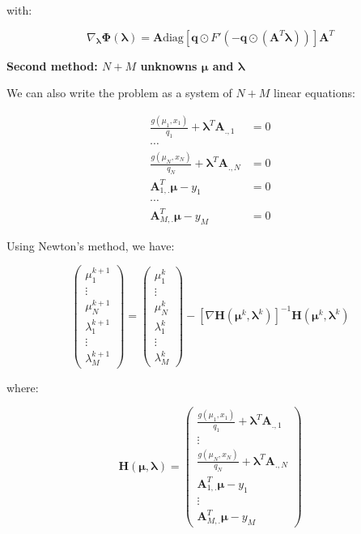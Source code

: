 \documentclass{tex/note}
\begin{document}
with:

\begin{equation*}
\nabla_{\bm{\lambda}} \bm{\Phi} \left( \bm{\lambda} \right) = \bm{A} \text{diag} \left[ \bm{q} \odot F' \left( - \bm{q} \odot \left( \bm{A}^T \bm{\lambda} \right) \right) \right] \bm{A}^T
\end{equation*}

\textbf{Second method: $N + M$ unknowns $\bm{\mu}$ and $\bm{\lambda}$}

We can also write the problem as a system of $N + M$ linear equations:

\begin{align*}
\frac{g \left( \mu_1 , x_1 \right)}{q_1} + \bm{\lambda}^T \bm{A}_{.,1} &= 0 \\
\cdots & \\
\frac{g \left( \mu_N , x_N \right)}{q_N} + \bm{\lambda}^T \bm{A}_{.,N} &= 0 \\
\bm{A}_{1,.}^T \bm{\mu} - y_1 &= 0 \\
\cdots & \\
\bm{A}_{M,.}^T \bm{\mu} - y_M &= 0
\end{align*}

Using Newton's method, we have:

\begin{equation*}
\begin{pmatrix} \mu_1^{k + 1} \\ \vdots \\ \mu_N^{k + 1} \\ \lambda_1^{k + 1} \\ \vdots \\ \lambda_M^{k + 1} \end{pmatrix} = \begin{pmatrix} \mu_1^k \\ \vdots \\ \mu_N^k \\ \lambda_1^k \\ \vdots \\ \lambda_M^k \end{pmatrix} - \left[ \nabla \bm{H} \left( \bm{\mu}^k , \bm{\lambda}^k \right) \right] ^{-1} \bm{H} \left( \bm{\mu}^k , \bm{\lambda}^k \right)
\end{equation*}

where:

\begin{equation*}
\bm{H} \left( \bm{\mu} , \bm{\lambda} \right) = \begin{pmatrix} \frac{g \left( \mu_1 , x_1 \right)}{q_1} + \bm{\lambda}^T \bm{A}_{.,1} \\ \vdots \\ \frac{g \left( \mu_N , x_N \right)}{q_N} + \bm{\lambda}^T \bm{A}_{.,N} \\ \bm{A}_{1,.}^T \bm{\mu} - y_1 \\ \vdots \\ \bm{A}_{M,.}^T \bm{\mu} - y_M \end{pmatrix}
\end{equation*}
\end{document}
